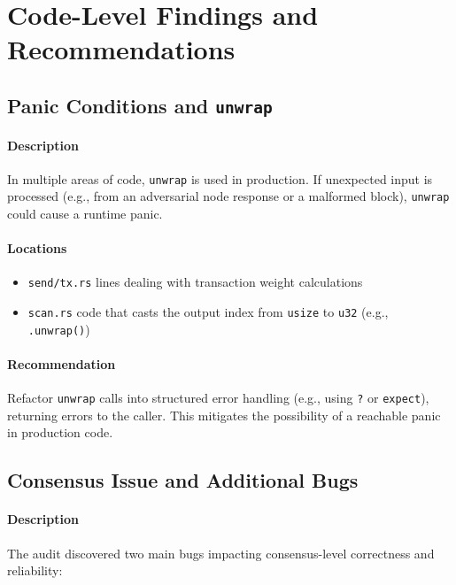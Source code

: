\documentclass[12pt,a4paper]{article}
\begin{document}
\section{Code-Level Findings and Recommendations}
\label{sec:monero-wallet-findings}

\subsection{Panic Conditions and \texttt{unwrap}}
\label{sec:monero-wallet-unwrap}
\paragraph{Description}
In multiple areas of code, \texttt{unwrap} is used in production. If unexpected input 
is processed (e.g., from an adversarial node response or a malformed block), 
\texttt{unwrap} could cause a runtime panic.

\paragraph{Locations}
\begin{itemize}
  \item \verb|send/tx.rs| lines dealing with transaction weight calculations
  \item \verb|scan.rs| code that casts the output index from \texttt{usize} to \texttt{u32} 
  (e.g., \texttt{.unwrap()})
\end{itemize}

\paragraph{Recommendation}
Refactor \texttt{unwrap} calls into structured error handling (e.g., using 
\texttt{?} or \texttt{expect}), returning errors to the caller. This mitigates 
the possibility of a reachable panic in production code.

\subsection{Consensus Issue and Additional Bugs}
\label{sec:monero-wallet-consensus}
\paragraph{Description}
The audit discovered two main bugs impacting consensus-level correctness and reliability:
\end{document}
